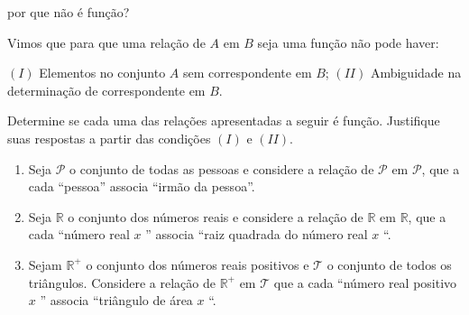 \documentclass[extrafontsizes, twoside, 11pt, openright, final]{memoir}
\begin{document}
\know{}
\label{\detokenize{AF106-3::doc}}\label{\detokenize{AF106-3:sec-aprofundando}}\label{\detokenize{AF106-3:para-saber-mais}}

\begin{task}{ por que não é função?}
	\label{\detokenize{AF106-3:ativ-nao-funcao}}\label{\detokenize{AF106-3:atividade-por-que-nao-e-funcao}}

	Vimos que para que uma relação de $A$ em $B$ seja uma função não pode haver:

	$(I)$ Elementos no conjunto $A$ sem correspondente em $B$;
	$(II)$ Ambiguidade na determinação de correspondente em $B$.

	Determine se cada uma das relações apresentadas a seguir é função. Justifique suas respostas a partir das condições $(I)$ e $(II)$.
	\begin{enumerate}
		\item Seja $\mathcal{P}$ o conjunto de todas as pessoas e considere a relação de $\mathcal{P}$ em $\mathcal{P}$, que a cada “pessoa” associa “irmão da pessoa”.

		\item Seja $\mathbb{R}$  o conjunto dos números reais e considere a relação de $\mathbb{R}$ em $\mathbb{R}$, que a cada “número real $x$ ” associa “raiz quadrada do número real $x$ “.

		\item Sejam $\mathbb{R}^+$ o conjunto dos números reais positivos e $\mathcal{T}$ o conjunto de todos os triângulos. Considere a relação de $\mathbb{R}^+$ em $\mathcal{T}$ que a cada “número real positivo $x$ ” associa “triângulo de área $x$ “.

	\end{enumerate}

\end{task}
\end{document}
